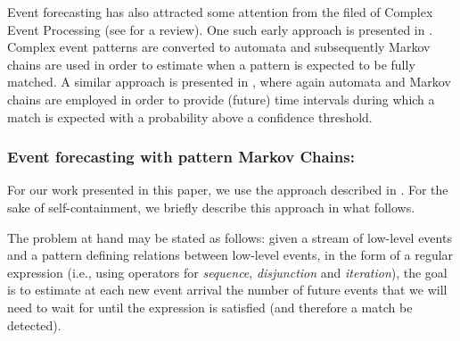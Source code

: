 Event forecasting has also attracted some attention from the filed of Complex Event Processing (see \cite{Cugola:2012:PFI:2187671.2187677} for a review).
One such early approach is presented in \cite{muthusamy_predictive_2010}.
Complex event patterns are converted to automata and subsequently
Markov chains are used in order to estimate when a pattern is expected to be fully matched.
A similar approach is presented in \cite{alevizos2017event},
where again automata and Markov chains are employed in order to provide (future) time intervals during which a match is expected with a probability above a confidence threshold. 

\subsubsection*{Event forecasting with pattern Markov Chains:\\}

For our work presented in this paper,
we use the approach described in \cite{alevizos2017event}.
For the sake of self-containment,
we briefly describe this approach in what follows.

The problem at hand may be stated as follows: given a stream of low-level events and a pattern defining relations between low-level events, 
in the form of a regular expression (i.e., using operators for \textit{sequence}, \textit{disjunction} and \textit{iteration}),
the goal is to estimate at each new event arrival the number of future events
that we will need to wait for until the expression is satisfied (and therefore a match be detected).

